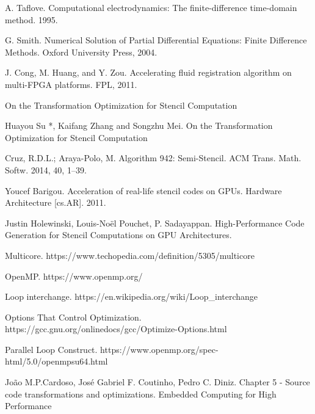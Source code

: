 \documentclass[conference]{IEEEtran}
\begin{document}
\begin{thebibliography}{1}

A. Taflove. Computational electrodynamics: The finite-difference time-domain method. 1995.

G. Smith. Numerical Solution of Partial Differential Equations: Finite Difference Methods. Oxford University Press, 2004.

J. Cong, M. Huang, and Y. Zou. Accelerating fluid registration algorithm on multi-FPGA platforms. FPL, 2011.

On the Transformation Optimization for Stencil Computation

Huayou Su *, Kaifang Zhang and Songzhu Mei. On the Transformation Optimization for Stencil Computation

Cruz, R.D.L.; Araya-Polo, M. Algorithm 942: Semi-Stencil. ACM Trans. Math. Softw. 2014, 40, 1–39.

Youcef Barigou. Acceleration of real-life stencil codes on GPUs. Hardware Architecture [cs.AR]. 2011.

Justin Holewinski, Louis-Noël Pouchet, P. Sadayappan. High-Performance Code Generation for Stencil Computations on GPU Architectures.

Multicore. https://www.techopedia.com/definition/5305/multicore

OpenMP. https://www.openmp.org/

Loop interchange. https://en.wikipedia.org/wiki/Loop_interchange

Options That Control Optimization. https://gcc.gnu.org/onlinedocs/gcc/Optimize-Options.html

Parallel Loop Construct. https://www.openmp.org/spec-html/5.0/openmpsu64.html

João M.P.Cardoso, José Gabriel F. Coutinho, Pedro C. Diniz. Chapter 5 - Source code transformations and optimizations. Embedded Computing for High Performance

\end{thebibliography}
\end{document}
